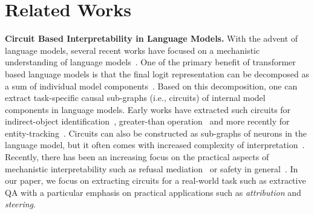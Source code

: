 \section{Related Works}
\textbf{Circuit Based Interpretability in Language Models.} With the advent of language models, several recent works have focused on a mechanistic understanding of language models~\citep{meng2023locatingeditingfactualassociations, turner2024activationadditionsteeringlanguage, lieberum2023doescircuitanalysisinterpretability, mcdougall2023copysuppressioncomprehensivelyunderstanding, gould2023successorheadsrecurringinterpretable}. One of the primary benefit of transformer based language models is that the final logit representation can be decomposed as a sum of individual model components~\citep{elhage2021mathematical}. Based on this decomposition, one can extract task-specific causal sub-graphs (i.e., circuits) of internal model components in language models. Early works have extracted such circuits for indirect-object identification~\citep{wang2022interpretabilitywildcircuitindirect}, greater-than operation~\citep{hanna2023doesgpt2computegreaterthan} and more recently for entity-tracking~\citep{prakash2024finetuningenhancesexistingmechanisms}. %
Circuits can also be constructed as sub-graphs of neurons in the language model, but it often comes with increased complexity of interpretation~\citep{elhage2022superposition}. Recently, there has been an increasing focus on the practical aspects of mechanistic interpretability such as refusal mediation~\citep{arditi2024refusallanguagemodelsmediated, zheng2024promptdrivensafeguardinglargelanguage} or safety in general~\citep{zou2023representationengineeringtopdownapproach}. In our paper, we focus on extracting circuits for a real-world task such as extractive QA with a particular emphasis on practical applications such as {\it attribution} and {\it steering}.

